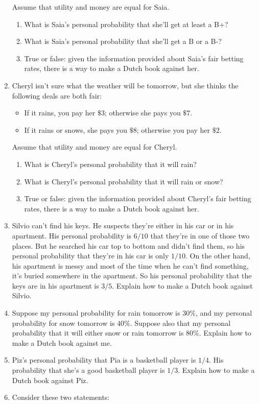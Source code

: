 \documentclass[justified]{tufte-book}
\providecommand{\tightlist}{%
  \setlength{\itemsep}{0pt}\setlength{\parskip}{0pt}}
\theoremstyle{definition}
\theoremstyle{definition}
\theoremstyle{definition}
\theoremstyle{definition}
\theoremstyle{remark}
\begin{document}
\begin{enumerate}
  Assume that utility and money are equal for Saia.

  \begin{enumerate}
  \def\labelenumii{\alph{enumii}.}
  \tightlist
  \item
    What is Saia's personal probability that she'll get at least a B+?
  \item
    What is Saia's personal probability that she'll get a B or a B-?
  \item
    True or false: given the information provided about Saia's fair betting rates, there is a way to make a Dutch book against her.
  \end{enumerate}
\item
  Cheryl isn't sure what the weather will be tomorrow, but she thinks the following deals are both fair:

  \begin{itemize}
  \tightlist
  \item
    If it rains, you pay her \(\$3\); otherwise she pays you \(\$7\).
  \item
    If it rains or snows, she pays you \(\$8\); otherwise you pay her \(\$2\).
  \end{itemize}

  Assume that utility and money are equal for Cheryl.

  \begin{enumerate}
  \def\labelenumii{\alph{enumii}.}
  \tightlist
  \item
    What is Cheryl's personal probability that it will rain?
  \item
    What is Cheryl's personal probability that it will rain or snow?
  \item
    True or false: given the information provided about Cheryl's fair betting rates, there is a way to make a Dutch book against her.
  \end{enumerate}
\item
  Silvio can't find his keys. He suspects they're either in his car or in his apartment. His personal probability is \(6/10\) that they're in one of those two places. But he searched his car top to bottom and didn't find them, so his personal probability that they're in his car is only \(1/10\). On the other hand, his apartment is messy and most of the time when he can't find something, it's buried somewhere in the apartment. So his personal probability that the keys are in his apartment is \(3/5\). Explain how to make a Dutch book against Silvio.
\item
  Suppose my personal probability for rain tomorrow is \(30\%\), and my personal probability for snow tomorrow is \(40\%\). Suppose also that my personal probability that it will either snow or rain tomorrow is \(80\%\). Explain how to make a Dutch book against me.
\item
  Piz's personal probability that Pia is a basketball player is \(1/4\). His probability that she's a good basketball player is \(1/3\). Explain how to make a Dutch book against Piz.
\item
  Consider these two statements:


\end{enumerate}
\end{document}
